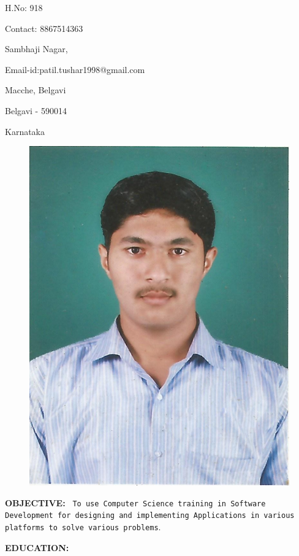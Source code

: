 \documentclass{article}
\begin{document}
	
	\begin{minipage}{2in}
	H.No: 918
	\end{minipage}
	\hfill
	\begin{minipage}{2.25in}
	Contact: 8867514363
	\end{minipage}

	
	\begin{minipage}{2in}
	Sambhaji Nagar,
	\end{minipage}
	\hfill
	Email-id:patil.tushar1998@gmail.com
	
	\begin{minipage}{2in}
	Macche, Belgavi
	\end{minipage}
	
	\begin{minipage}{2in}
	Belgavi - 590014
	\end{minipage}

	\begin{minipage}{2in}
	Karnataka
	\end{minipage}

	\begin{figure}[h!]
		\hfill
		\includegraphics[scale = 0.6]{profilepic.jpg}
		\label{image_1} %
	\end{figure}
	
		
\large \textbf{OBJECTIVE:}
	\texttt{	
	To use Computer Science training in Software Development for designing and implementing Applications in various platforms to solve various problems}.
	
	\large \textbf{EDUCATION:}
	
\end{document}
